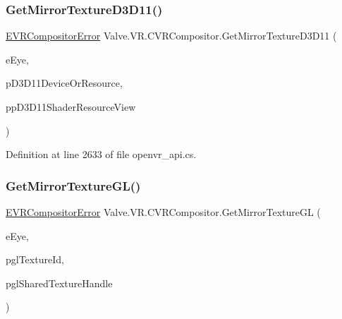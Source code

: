 \mbox{\label{class_valve_1_1_v_r_1_1_c_v_r_compositor_a4f2dd54d640a7035332b10f5fb0a58ee}} 
\subsubsection{\texorpdfstring{GetMirrorTextureD3D11()}{GetMirrorTextureD3D11()}}
{\footnotesize\ttfamily \mbox{\hyperlink{namespace_valve_1_1_v_r_ac34ee1034fda668ccd45f57676ded81b}{E\+V\+R\+Compositor\+Error}} Valve.\+V\+R.\+C\+V\+R\+Compositor.\+Get\+Mirror\+Texture\+D3\+D11 (\begin{DoxyParamCaption}\item[{\mbox{\hyperlink{namespace_valve_1_1_v_r_a8153d4a3e627e1cede046327087c1880}{E\+V\+R\+Eye}}}]{e\+Eye,  }\item[{Int\+Ptr}]{p\+D3\+D11\+Device\+Or\+Resource,  }\item[{ref Int\+Ptr}]{pp\+D3\+D11\+Shader\+Resource\+View }\end{DoxyParamCaption})}



Definition at line 2633 of file openvr\+\_\+api.\+cs.

\mbox{\label{class_valve_1_1_v_r_1_1_c_v_r_compositor_a619e42191292bab5ef28e27141101888}} 
\subsubsection{\texorpdfstring{GetMirrorTextureGL()}{GetMirrorTextureGL()}}
{\footnotesize\ttfamily \mbox{\hyperlink{namespace_valve_1_1_v_r_ac34ee1034fda668ccd45f57676ded81b}{E\+V\+R\+Compositor\+Error}} Valve.\+V\+R.\+C\+V\+R\+Compositor.\+Get\+Mirror\+Texture\+GL (\begin{DoxyParamCaption}\item[{\mbox{\hyperlink{namespace_valve_1_1_v_r_a8153d4a3e627e1cede046327087c1880}{E\+V\+R\+Eye}}}]{e\+Eye,  }\item[{ref uint}]{pgl\+Texture\+Id,  }\item[{Int\+Ptr}]{pgl\+Shared\+Texture\+Handle }\end{DoxyParamCaption})}



